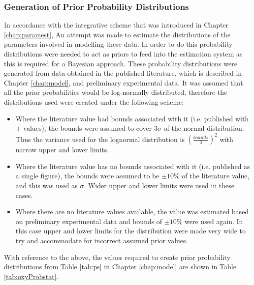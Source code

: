 \subsubsection{Generation of Prior Probability Distributions}
In accordance with the integrative scheme that was introduced in Chapter \ref{chap:paramest}, An attempt was made to estimate the distributions of the parameters involved in modelling these data. In order to do this probability distributions were needed to act as priors to feed into the estimation system as this is required for a Bayesian approach. These probability distributions were generated from data obtained in the published literature, which is described in Chapter \ref{chap:model}, and preliminary experimental data. It was assumed that all the prior probabilities would be log-normally distributed, therefore the distributions  used were created under the following scheme:
\begin{itemize}
\item Where the literature value had bounds associated with it (i.e. published with $\pm{}$ values), the bounds were assumed to cover $3 \sigma$ of the normal distribution. Thus the variance used for the lognormal distribution is $\left(\frac{bounds}{3}\right)^2$ with narrow upper and lower limits.
\item Where the literature value has no bounds associated with it (i.e. published as a single figure), the bounds were assumed to be $\pm 10\%$ of the literature value, and this was used as $\sigma$. Wider upper and lower limits were used in these cases.
\item Where there are no literature values available, the value was estimated based on preliminary experimental data and bounds of $\pm 10\%$ were used again. In this case upper and lower limits for the distribution were made very wide to try and accommodate for incorrect assumed prior values.
\end{itemize}

\noindent With reference to the above, the values required to create prior probability distributions from Table \ref{tab:ps} in Chapter \ref{chap:model} are shown in Table \ref{tab:oxyProbstat}.

